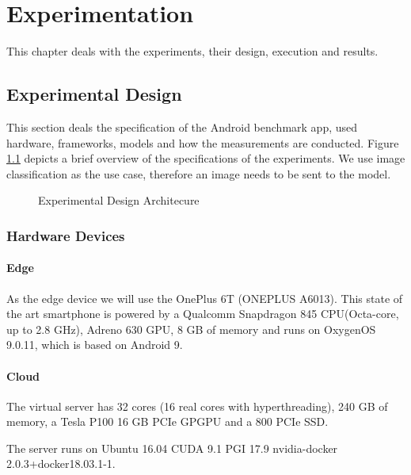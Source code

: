 \chapter{Experimentation}
\label{chap:experiments}
This chapter deals with the experiments, their design, execution and results.

 
\section{Experimental Design}
This section deals the specification of the Android benchmark app, used hardware, frameworks, models and how the measurements are conducted. 
Figure \ref{fig:expDesign} depicts a brief overview of the specifications of the experiments.
We use image classification as the use case, therefore an image needs to be sent to the model.
\begin{figure}[H]
\centering
\resizebox{.95\linewidth}{!}{}
\caption{Experimental Design Architecure}
\label{fig:expDesign}
\end{figure}


\subsection{Hardware Devices}
\subsubsection{Edge}
\label{chap:hardwareEdge}
As the edge device we will use the OnePlus 6T (ONEPLUS A6013). This state of the art smartphone is powered by a Qualcomm Snapdragon 845 CPU(Octa-core, up to 2.8 GHz), Adreno 630 GPU, 8 GB of memory and runs on OxygenOS 9.0.11, which is based on Android 9.
\subsubsection{Cloud}
The virtual server has 32 cores (16 real cores with hyperthreading), 240 GB of memory, a Tesla P100 16 GB PCIe GPGPU and a 800 PCIe SSD.

The server runs on Ubuntu 16.04 CUDA 9.1 PGI 17.9 nvidia-docker 2.0.3+docker18.03.1-1.
